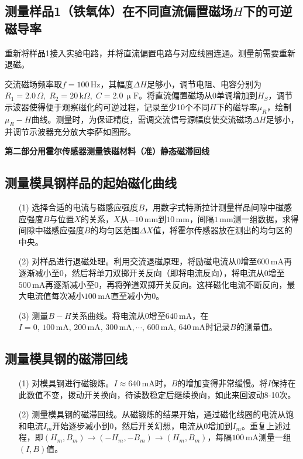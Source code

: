 \documentclass[12pt]{article}
\begin{document}
\subsection{测量样品1（铁氧体）在不同直流偏置磁场$ H $下的可逆磁导率}

重新将样品1接入实验电路，并将直流偏置电路与对应线圈连通。测量前需要重新退磁。

交流磁场频率取$ f=100\,\mathrm{Hz} $，其幅度$ \Delta H $足够小，调节电阻、电容分别为$ R_1=2.0\,\Omega,\;R_2=20\,\mathrm k\Omega,\;C=2.0\,\upmu\mathrm F $。将直流偏置磁场从0单调增加到$ H_S $，调节示波器使得便于观察磁化的可逆过程，记录至少10个不同$ H $下的磁导率$ \mu_R $，绘制$ \mu_R-H $曲线。测量时，为保证精度，需调交流信号源幅度使交流磁场$\Delta H$足够小，并调节示波器充分放大李萨如图形。

\begin{center}
    \large \textbf{第二部分}\quad\textbf{用霍尔传感器测量铁磁材料（准）静态磁滞回线}
\end{center}

\subsection{测量模具钢样品的起始磁化曲线}

\begin{enumerate}
    \item[(1)] 选择合适的电流与磁感应强度$B$，用数字式特斯拉计测量样品间隙中磁感应强度$B$与位置$X$的关系，$X$从$-10\,\mathrm{mm}$到$10\,\mathrm{mm}$，间隔$1\,\mathrm{mm}$测一组数据，求得间隙中磁感应强度$B$的均匀区范围$\Delta X$值，将霍尔传感器放在测出的均匀区的中央。
    \item[(2)] 对样品进行退磁处理。利用交流退磁原理，将励磁电流从$0$增至$600\,\mathrm{mA}$再逐渐减小至$0$，然后将单刀双掷开关反向（即将电流反向），将电流从$0$增至$500\,\mathrm{mA}$再逐渐减小至$0$，再将弹道双掷开关反向。这样磁化电流不断反向，最大电流值每次减小$100\,\mathrm{mA}$直至减小为0。
    \item[(3)] 测量$B-H$关系曲线。将电流从$0$增至$640\,\mathrm{mA}$，在$I=0,\,100\,\mathrm{mA},\,200\,\mathrm{mA},\,300\,\mathrm{mA},\cdots,\,600\,\mathrm{mA},\,640\,\mathrm{mA}$时记录$B$的测量值。
\end{enumerate}

\subsection{测量模具钢的磁滞回线}

\begin{enumerate}
    \item[(1)] 对模具钢进行磁锻炼。$I\approx640\,\mathrm{mA}$时，$B$的增加变得非常缓慢。将$I$保持在此数值不变，拨动开关换向，待读数稳定后继续换向，如此来回波动8-10次。
    \item[(2)] 测量模具钢的磁滞回线。从磁锻炼的结果开始，通过磁化线圈的电流从饱和电流$I_m$开始逐步减小到$0$，然后开关幻想，电流从$0$增加到$I_m$。重复上述过程，即$(H_m,B_m)\to(-H_m,-B_m)\to(H_m,B_m)$，每隔$100\,\mathrm{mA}$测量一组$(I,B)$值。
\end{enumerate}
\end{document}
